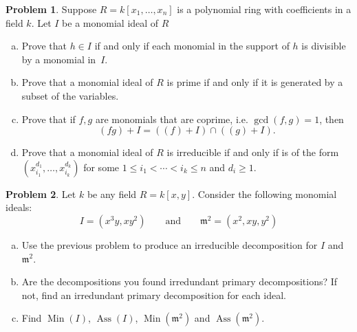 \documentclass[11pt]{article}
\DeclareMathOperator{\Ass}{Ass}
\DeclareMathOperator{\Min}{Min}
\newcommand{\m}{\mathfrak{m}}
\theoremstyle{definition}
\newtheorem{problem}{Problem}
\begin{document}
\begin{problem}
Suppose $R = k[x_1,\ldots, x_n]$ is a polynomial ring with coefficients in a field $k$. 
Let $I$ be a monomial ideal of $R$
\begin{enumerate}[a)]
\item Prove that $h\in I$ if and only if each monomial in the support of $h$ is divisible by a monomial in~$I$. 
\item Prove that a monomial ideal of $R$ is prime if and only if it is generated by a subset of the variables.
\item Prove that if $f,g$ are monomials that are coprime, i.e. $\gcd(f,g)=1$, then 
$$(fg)+I=((f)+I)\cap ((g)+I).$$
\item Prove that a monomial ideal of $R$ is irreducible if and only if is of the form $(x_{i_1}^{d_1}, \ldots, x_{i_k}^{d_k})$ for some $1 \leqslant i_1< \cdots <i_k \leqslant n$ and $d_i \geqslant 1$.
\end{enumerate}
\end{problem}


\begin{problem}
Let $k$ be any field $R = k[x,y]$. Consider the following monomial ideals:
$$I = (x^3y, xy^2) \qquad \textrm{and} \qquad \m^2 = (x^2,xy, y^2)$$
\begin{enumerate}[a)]
\item Use the previous problem to produce an irreducible decomposition for $I$ and $\m^2$.
\item Are the decompositions you found irredundant primary decompositions? If not, find an irredundant primary decomposition for each ideal.
\item Find $\Min(I)$, $\Ass(I)$, $\Min(\m^2)$ and $\Ass(\m^2)$.
\end{enumerate}
\end{problem}
\end{document}

